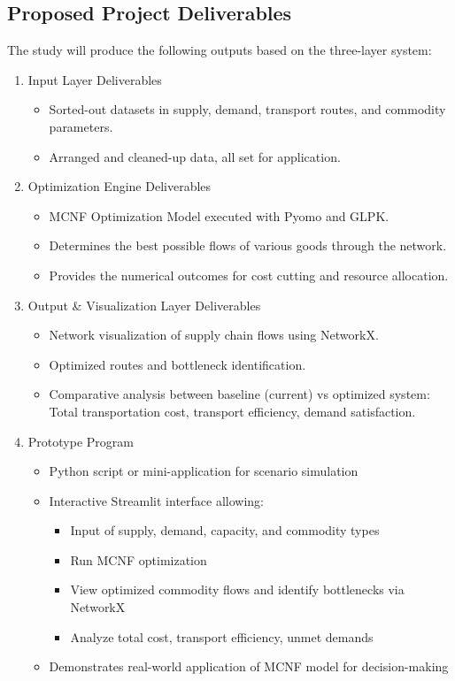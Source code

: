 \documentclass{icsthesis}
\begin{document}
\begin{mainmatter}
\subsection{Proposed Project Deliverables}
The study will produce the following outputs based on the three-layer system:

\begin{enumerate}
    \item {Input Layer Deliverables}
    \begin{itemize}
        \item Sorted-out datasets in supply, demand, transport routes, and commodity parameters.
        \item Arranged and cleaned-up data, all set for application.
    \end{itemize}

    \item {Optimization Engine Deliverables}
    \begin{itemize}
        \item MCNF Optimization Model executed with Pyomo and GLPK.
        \item Determines the best possible flows of various goods through the network.
        \item Provides the numerical outcomes for cost cutting and resource allocation.
    \end{itemize}

    \item {Output \& Visualization Layer Deliverables}
    \begin{itemize}
        \item Network visualization of supply chain flows using NetworkX.
        \item Optimized routes and bottleneck identification.
        \item Comparative analysis between baseline (current) vs optimized system: Total transportation cost, transport efficiency, demand satisfaction.
    \end{itemize}

    \item {Prototype Program}
    \begin{itemize}
        \item Python script or mini-application for scenario simulation
        \item Interactive Streamlit interface allowing:
        \begin{itemize}
            \item Input of supply, demand, capacity, and commodity types
            \item Run MCNF optimization
            \item View optimized commodity flows and identify bottlenecks via NetworkX
            \item Analyze total cost, transport efficiency, unmet demands
        \end{itemize}
        \item Demonstrates real-world application of MCNF model for decision-making
    \end{itemize}



\end{enumerate}
\end{mainmatter}
\end{document}
